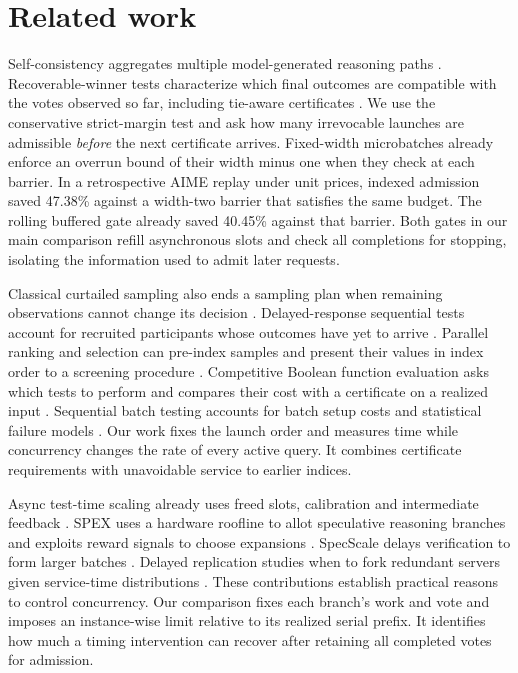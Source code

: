 \section{Related work}
Self-consistency aggregates multiple model-generated reasoning paths \citep{wang2023sc}. Recoverable-winner tests characterize which final outcomes are compatible with the votes observed so far, including tie-aware certificates \citep{recover}. We use the conservative strict-margin test and ask how many irrevocable launches are admissible \emph{before} the next certificate arrives. Fixed-width microbatches already enforce an overrun bound of their width minus one when they check at each barrier. In a retrospective AIME replay under unit prices, indexed admission saved 47.38\% against a width-two barrier that satisfies the same budget. The rolling buffered gate already saved 40.45\% against that barrier. Both gates in our main comparison refill asynchronous slots and check all completions for stopping, isolating the information used to admit later requests.

Classical curtailed sampling also ends a sampling plan when remaining observations cannot change its decision \citep{curtail}. Delayed-response sequential tests account for recruited participants whose outcomes have yet to arrive \citep{Hampson_2012}. Parallel ranking and selection can pre-index samples and present their values in index order to a screening procedure \citep{Ni_2017}. Competitive Boolean function evaluation asks which tests to perform and compares their cost with a certificate on a realized input \citep{cicalese}. Sequential batch testing accounts for batch setup costs and statistical failure models \citep{Segev_2022,yang2024testing}. Our work fixes the launch order and measures time while concurrency changes the rate of every active query. It combines certificate requirements with unavoidable service to earlier indices.

Async test-time scaling already uses freed slots, calibration and intermediate feedback \citep{duchess,atts,mars}. SPEX uses a hardware roofline to allot speculative reasoning branches and exploits reward signals to choose expansions \citep{zhong2026spex}. SpecScale delays verification to form larger batches \citep{jeong2026specscale}. Delayed replication studies when to fork redundant servers given service-time distributions \citep{badita2020stragglers}. These contributions establish practical reasons to control concurrency. Our comparison fixes each branch's work and vote and imposes an instance-wise limit relative to its realized serial prefix. It identifies how much a timing intervention can recover after retaining all completed votes for admission.

